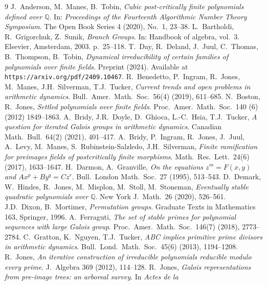 \documentclass[a4paper]{amsart}
\begin{document}
  
  \begin{thebibliography}{9}
   J.\ Anderson, M.\ Manes, B.\ Tobin, \textit{Cubic post-critically finite polynomials defined over $\mathbb{Q}$}. In: \textit{Proceedings of the Fourteenth Algorithmic Number Theory Symposium}. The Open Book Series 4 (2020), No.\ 1, 23--38.
   L.\ Bartholdi, R.\ Grigorchuk, Z.\ Sunik,  \textit{Branch Groups}. In: Handbook of algebra, vol.\ 3. Elsevier, Amsterdam, 2003. p.\ 25--118.
   T.\ Day, R.\ Deland, J.\ Juul, C.\ Thomas, B.\ Thompson, B.\ Tobin, \textit{Dynamical irreducibility of certain families of polynomials over finite fields}. Preprint (2024). Available at  \texttt{https://arxiv.org/pdf/2409.10467}.
   R.\ Benedetto, P.\ Ingram, R.\ Jones, M.\ Manes, J.H.\ Silverman, T.J.\ Tucker, \textit{Current trends and open problems in arithmetic dynamics}. Bull.\ Amer.\ Math.\ Soc.\  56(4) (2019), 611--685.
   N.\ Boston, R.\ Jones, \textit{Settled polynomials over finite fields}. Proc.\ Amer.\ Math.\ Soc.\ 140 (6) (2012) 1849--1863.
    A.\ Bridy, J.R.\ Doyle, D.\ Ghioca, L.-C.\ Hsia, T.J.\ Tucker, \textit{A question for iterated Galois groups in arithmetic dynamics}. Canadian Math.\ Bull.\ 64(2) (2021), 401--417.
     A.\ Bridy, P.\ Ingram, R.\ Jones, J.\ Juul, A.\ Levy, M.\ Manes, S.\ Rubinstein-Salzledo, J.H.\ Silverman, \textit{Finite ramification for preimages fields of postcritically finite morphisms}. Math.\ Res.\ Lett.\ 24(6) (2017), 1633--1647.
     H.\ Darmon, A.\ Granville, \textit{On the equations $z^m=F(x,y)$ and $Ax^p+By^q=Cz^r$}. Bull.\ London Math.\ Soc.\ 27 (1995), 513--543.
     D.\ Demark, W.\ Hindes, R.\ Jones, M.\ Misplon, M.\ Stoll, M.\ Stoneman, \textit{Eventually stable quadratic polynomials over $\mathbb{Q}$}. New York J.\ Math.\ 26 (2020), 526--561.
      J.D.\ Dixon, B.\ Mortimer, \textit{Permutation groups}. Graduate Texts in Mathematics 163, Springer, 1996.
   A.\ Ferraguti, \textit{The set of stable primes for polynomial sequences with large Galois group}. Proc.\ Amer.\ Math.\ Soc.\ 146(7) (2018), 2773--2784.
   C.\ Gratton, K.\ Nguyen, T.J.\ Tucker, \textit{ABC implies primitive prime divisors in arithmetic dynamics}. Bull.\ Lond.\ Math.\ Soc.\ 45(6) (2013), 1194--1208.
   R.\ Jones, \textit{An iterative construction of irreducible polynomials reducible modulo every prime}. J.\ Algebra 369 (2012), 114--128.
    R.\ Jones, \textit{Galois representations from pre-image trees: an arboreal survey}. In {\it Actes de la
}
\end{thebibliography}
\end{document}

